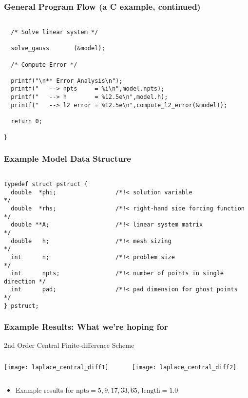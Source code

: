 \documentclass[mathserif]{beamer}
\begin{document}
\begin{frame}[fragile]
  \frametitle{General Program Flow (a C example, continued)}
{\tiny
  \begin{verbatim}

  /* Solve linear system */

  solve_gauss       (&model);

  /* Compute Error */

  printf("\n** Error Analysis\n");
  printf("   --> npts     = %i\n",model.npts);
  printf("   --> h        = %12.5e\n",model.h);
  printf("   --> l2 error = %12.5e\n",compute_l2_error(&model));

  return 0;

}
\end{verbatim}
}  
\end{frame}


\begin{frame}[fragile]
  \frametitle{Example Model Data Structure}
{\tiny
  \begin{verbatim}

typedef struct pstruct {
  double  *phi;                 /*!< solution variable                    */
  double  *rhs;                 /*!< right-hand side forcing function     */
  double **A;                   /*!< linear system matrix                 */
  double   h;                   /*!< mesh sizing                          */
  int      n;                   /*!< problem size                         */
  int      npts;                /*!< number of points in single direction */
  int      pad;                 /*!< pad dimension for ghost points       */
} pstruct;

\end{verbatim}
}  
\end{frame}

\begin{frame}
  \frametitle{Example Results: What we're hoping for}
  2nd Order Central Finite-difference Scheme

\begin{center}
\begin{columns}[c]
\begin{column}{6cm}
    \texttt{[image: laplace\_central\_diff1]}
\end{column}
\begin{column}{6cm}
    \texttt{[image: laplace\_central\_diff2]}
\end{column}
\end{columns}
\begin{itemize}
\item Example results for $\text{npts} = 5,9,17,33,65$, $\text{length} = 1.0$
\end{itemize}
  \end{center}
  
\end{frame}
\end{document}
